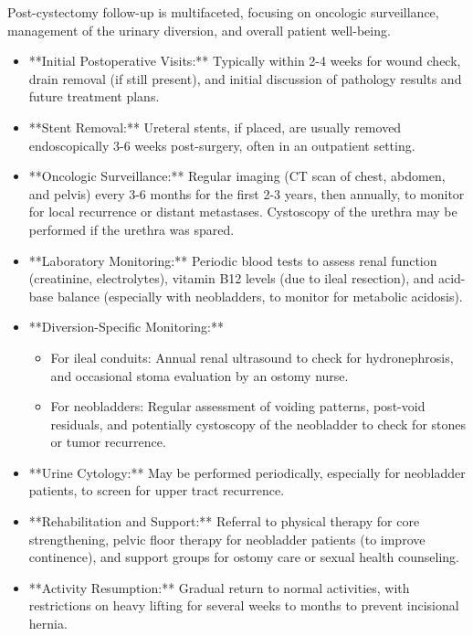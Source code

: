Post-cystectomy follow-up is multifaceted, focusing on oncologic surveillance, management of the urinary diversion, and overall patient well-being.

\begin{itemize}
  \item **Initial Postoperative Visits:** Typically within 2-4 weeks for wound check, drain removal (if still present), and initial discussion of pathology results and future treatment plans.
  
  \item **Stent Removal:** Ureteral stents, if placed, are usually removed endoscopically 3-6 weeks post-surgery, often in an outpatient setting.
  
  \item **Oncologic Surveillance:** Regular imaging (CT scan of chest, abdomen, and pelvis) every 3-6 months for the first 2-3 years, then annually, to monitor for local recurrence or distant metastases. Cystoscopy of the urethra may be performed if the urethra was spared.
  
  \item **Laboratory Monitoring:** Periodic blood tests to assess renal function (creatinine, electrolytes), vitamin B12 levels (due to ileal resection), and acid-base balance (especially with neobladders, to monitor for metabolic acidosis).
  
  \item **Diversion-Specific Monitoring:**
    \begin{itemize}
      \item For ileal conduits: Annual renal ultrasound to check for hydronephrosis, and occasional stoma evaluation by an ostomy nurse.
      \item For neobladders: Regular assessment of voiding patterns, post-void residuals, and potentially cystoscopy of the neobladder to check for stones or tumor recurrence.
    \end{itemize}
  
  \item **Urine Cytology:** May be performed periodically, especially for neobladder patients, to screen for upper tract recurrence.
  
  \item **Rehabilitation and Support:** Referral to physical therapy for core strengthening, pelvic floor therapy for neobladder patients (to improve continence), and support groups for ostomy care or sexual health counseling.
  
  \item **Activity Resumption:** Gradual return to normal activities, with restrictions on heavy lifting for several weeks to months to prevent incisional hernia.
\end{itemize}

